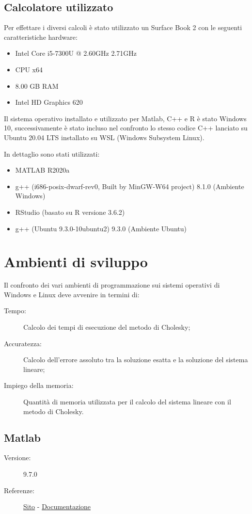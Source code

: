 \documentclass[preprint,12pt]{elsarticle}
\begin{document}
\subsection{Calcolatore utilizzato}

Per effettare i diversi calcoli è stato utilizzato un Surface Book 2 con le seguenti caratteristiche hardware:
\begin{itemize}
	\item Intel Core i5-7300U @ 2.60GHz 2.71GHz
	\item CPU x64
	\item 8.00 GB RAM
	\item Intel HD Graphics 620
\end{itemize}

Il sistema operativo installato e utilizzato per Matlab, C++ e R è stato Windows 10, successivamente è stato incluso nel confronto lo stesso codice C++ lanciato su Ubuntu 20.04 LTS installato su WSL (Windows Subsystem Linux).

In dettaglio sono stati utilizzati:
\begin{itemize}
	\item MATLAB R2020a
	\item g++ (i686-posix-dwarf-rev0, Built by MinGW-W64 project) 8.1.0 (Ambiente Windows)
	\item RStudio (basato su R versione 3.6.2)
	\item g++ (Ubuntu 9.3.0-10ubuntu2) 9.3.0 (Ambiente Ubuntu)
\end{itemize}

\newpage


\section{Ambienti di sviluppo}

Il confronto dei vari ambienti di programmazione sui sistemi operativi di Windows e Linux deve avvenire in termini di:
\begin{description}
	\item[Tempo:] Calcolo dei tempi di esecuzione del metodo di Cholesky;
	\item[Accuratezza:] Calcolo dell'errore assoluto tra la soluzione esatta e la soluzione del sistema lineare;
	\item[Impiego della memoria:] Quantità di memoria utilizzata per il calcolo del sistema lineare con il metodo di Cholesky.
\end{description}


\subsection{Matlab}
\medskip
\begin{description}
	\item[Versione:] 9.7.0
	\item[Referenze:] \href{https://it.mathworks.com/products/matlab.html}{Sito} - \href{https://www.mathworks.com/help/matlab/}{Documentazione}
\end{description}
\end{document}
